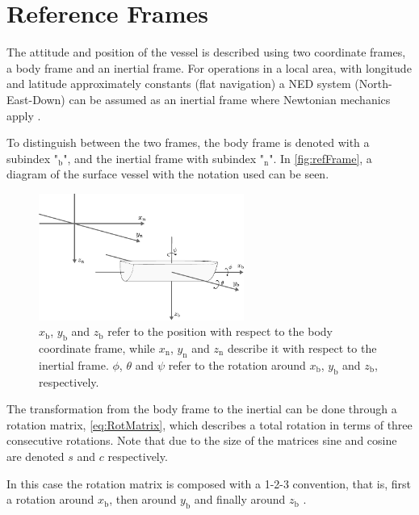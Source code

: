 \section{Reference Frames}\label{sec:frames}
The attitude and position of the vessel is described using two coordinate frames, a body frame and an inertial frame. For operations in a local area, with longitude and latitude approximately constants (flat navigation) a NED system (North-East-Down) can be assumed as an inertial frame where Newtonian mechanics apply \cite[p. 17]{TFossen}.

To distinguish between the two frames, the body frame is denoted with a subindex "$_\mathrm{b}$", and the inertial frame with subindex "$_\mathrm{n}$". In \autoref{fig:refFrame}, a diagram of the surface vessel with the notation used can be seen.
\begin{figure}[H]
    \includegraphics[width=0.6\textwidth]{figures/boat3D}
    \caption{$x_\mathrm{b}$, $y_\mathrm{b}$ and $z_\mathrm{b}$ refer to the position with respect to the body coordinate frame, while $x_\mathrm{n}$, $y_\mathrm{n}$ and $z_\mathrm{n}$ describe it with respect to the inertial frame. $\phi$, $\theta$ and $\psi$ refer to the rotation around $x_\mathrm{b}$, $y_\mathrm{b}$ and $z_\mathrm{b}$, respectively.}
    \label{fig:refFrame}
\end{figure}

The transformation from the body frame to the inertial can be done through a rotation matrix, \eqref{eq:RotMatrix}, which describes a total rotation in terms of three consecutive rotations. Note that due to the size of the matrices sine and cosine are denoted $s$ and $c$ respectively.

In this case the rotation matrix is composed with a 1-2-3 convention, that is, first a rotation around $x_{\mathrm{b}}$, then around $y_{\mathrm{b}}$ and finally around $z_{\mathrm{b}}$ \cite[p. 22]{TFossen}.

